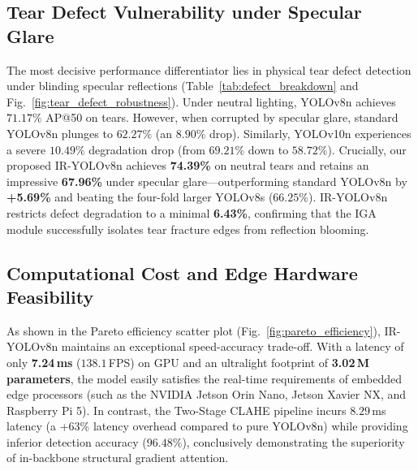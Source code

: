 \documentclass[twocolumn]{svjour3}
\begin{document}
\subsection{Tear Defect Vulnerability under Specular Glare}
The most decisive performance differentiator lies in physical tear defect detection under blinding specular reflections (Table~\ref{tab:defect_breakdown} and Fig.~\ref{fig:tear_defect_robustness}). Under neutral lighting, YOLOv8n achieves $71.17\%$ AP@50 on tears. However, when corrupted by specular glare, standard YOLOv8n plunges to $62.27\%$ (an $8.90\%$ drop). Similarly, YOLOv10n experiences a severe $10.49\%$ degradation drop (from $69.21\%$ down to $58.72\%$). Crucially, our proposed IR-YOLOv8n achieves \textbf{74.39\%} on neutral tears and retains an impressive \textbf{67.96\%} under specular glare—outperforming standard YOLOv8n by \textbf{+5.69\%} and beating the four-fold larger YOLOv8s ($66.25\%$). IR-YOLOv8n restricts defect degradation to a minimal \textbf{6.43\%}, confirming that the IGA module successfully isolates tear fracture edges from reflection blooming.

\subsection{Computational Cost and Edge Hardware Feasibility}
As shown in the Pareto efficiency scatter plot (Fig.~\ref{fig:pareto_efficiency}), IR-YOLOv8n maintains an exceptional speed-accuracy trade-off. With a latency of only \textbf{7.24\,ms} ($138.1$\,FPS) on GPU and an ultralight footprint of \textbf{3.02\,M parameters}, the model easily satisfies the real-time requirements of embedded edge processors (such as the NVIDIA Jetson Orin Nano, Jetson Xavier NX, and Raspberry Pi 5). In contrast, the Two-Stage CLAHE pipeline incurs $8.29$\,ms latency (a +$63\%$ latency overhead compared to pure YOLOv8n) while providing inferior detection accuracy ($96.48\%$), conclusively demonstrating the superiority of in-backbone structural gradient attention.
\end{document}
